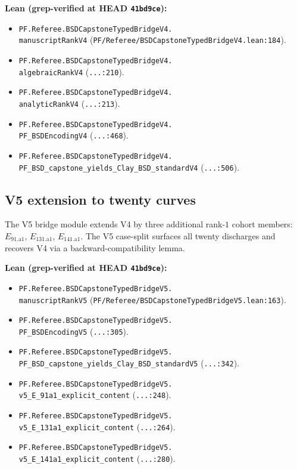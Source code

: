 \documentclass[11pt,a4paper]{article}
\theoremstyle{plain}
\theoremstyle{definition}
\theoremstyle{remark}
\begin{document}
\textbf{Lean (grep-verified at HEAD \texttt{41bd9ce}):}
\begin{itemize}[leftmargin=*,nosep]
\item \texttt{PF.Referee.BSDCapstoneTypedBridgeV4.\\
   manuscriptRankV4}
   (\texttt{PF/Referee/BSDCapstoneTypedBridgeV4.lean:184}).
\item \texttt{PF.Referee.BSDCapstoneTypedBridgeV4.\\
   algebraicRankV4} (\texttt{...:210}).
\item \texttt{PF.Referee.BSDCapstoneTypedBridgeV4.\\
   analyticRankV4} (\texttt{...:213}).
\item \texttt{PF.Referee.BSDCapstoneTypedBridgeV4.\\
   PF\_BSDEncodingV4} (\texttt{...:468}).
\item \texttt{PF.Referee.BSDCapstoneTypedBridgeV4.\\
   PF\_BSD\_capstone\_yields\_Clay\_BSD\_standardV4}
   (\texttt{...:506}).
\end{itemize}

\subsection{V5 extension to twenty curves}

The V5 bridge module extends V4 by three additional rank-$1$
cohort members: $E_{91.\mathrm{a}1}$, $E_{131.\mathrm{a}1}$,
$E_{141.\mathrm{a}1}$. The V5 case-split surfaces all twenty
discharges and recovers V4 via a backward-compatibility lemma.

\textbf{Lean (grep-verified at HEAD \texttt{41bd9ce}):}
\begin{itemize}[leftmargin=*,nosep]
\item \texttt{PF.Referee.BSDCapstoneTypedBridgeV5.\\
   manuscriptRankV5}
   (\texttt{PF/Referee/BSDCapstoneTypedBridgeV5.lean:163}).
\item \texttt{PF.Referee.BSDCapstoneTypedBridgeV5.\\
   PF\_BSDEncodingV5} (\texttt{...:305}).
\item \texttt{PF.Referee.BSDCapstoneTypedBridgeV5.\\
   PF\_BSD\_capstone\_yields\_Clay\_BSD\_standardV5}
   (\texttt{...:342}).
\item \texttt{PF.Referee.BSDCapstoneTypedBridgeV5.\\
   v5\_E\_91a1\_explicit\_content} (\texttt{...:248}).
\item \texttt{PF.Referee.BSDCapstoneTypedBridgeV5.\\
   v5\_E\_131a1\_explicit\_content} (\texttt{...:264}).
\item \texttt{PF.Referee.BSDCapstoneTypedBridgeV5.\\
   v5\_E\_141a1\_explicit\_content} (\texttt{...:280}).
\end{itemize}
\end{document}
